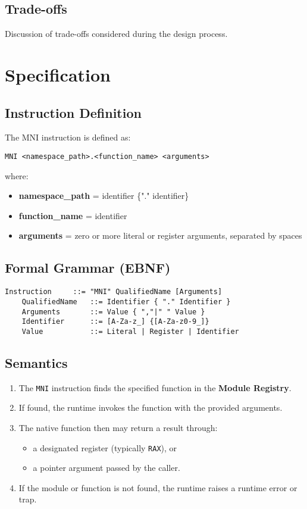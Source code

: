 \documentclass[11pt]{article}
\begin{document}
	\subsection{Trade-offs}
	Discussion of trade-offs considered during the design process.
	
	\section{Specification}

	\subsection{Instruction Definition}
	The MNI instruction is defined as:

	\begin{lstlisting}[language=MicroASM]
	MNI <namespace_path>.<function_name> <arguments>
	\end{lstlisting}

	where:
	\begin{itemize}
		\item \textbf{namespace\_path} = identifier \{"." identifier\}
		\item \textbf{function\_name} = identifier
		\item \textbf{arguments} = zero or more literal or register arguments, separated by spaces
	\end{itemize}

	\subsection{Formal Grammar (EBNF)}
	\begin{lstlisting}[language=MicroASM]
	Instruction     ::= "MNI" QualifiedName [Arguments]
	QualifiedName   ::= Identifier { "." Identifier }
	Arguments       ::= Value { ","|" " Value }
	Identifier      ::= [A-Za-z_] {[A-Za-z0-9_]}
	Value           ::= Literal | Register | Identifier
	\end{lstlisting}

	\subsection{Semantics}
	\begin{enumerate}
		\item The \texttt{MNI} instruction finds the specified function in the \textbf{Module Registry}.
		\item If found, the runtime invokes the function with the provided arguments.
		\item The native function then may return a result through:
		\begin{itemize}
			\item a designated register (typically \texttt{RAX}), or
			\item a pointer argument passed by the caller.
		\end{itemize}
		\item If the module or function is not found, the runtime raises a runtime error or trap.
	\end{enumerate}
\end{document}
